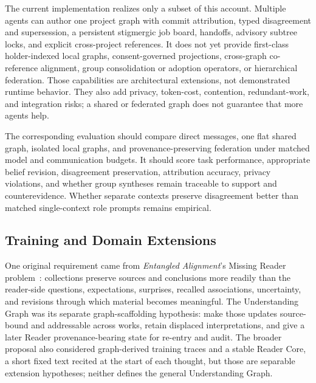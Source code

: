 The current implementation realizes only a subset of this account. Multiple agents can author one project graph with commit attribution, typed disagreement and supersession, a persistent stigmergic job board, handoffs, advisory subtree locks, and explicit cross-project references. It does not yet provide first-class holder-indexed local graphs, consent-governed projections, cross-graph co-reference alignment, group consolidation or adoption operators, or hierarchical federation. Those capabilities are architectural extensions, not demonstrated runtime behavior. They also add privacy, token-cost, contention, redundant-work, and integration risks; a shared or federated graph does not guarantee that more agents help.

The corresponding evaluation should compare direct messages, one flat shared graph, isolated local graphs, and provenance-preserving federation under matched model and communication budgets. It should score task performance, appropriate belief revision, disagreement preservation, attribution accuracy, privacy violations, and whether group syntheses remain traceable to support and counterevidence. Whether separate contexts preserve disagreement better than matched single-context role prompts remains empirical.

\subsection{Training and Domain Extensions}

One original requirement came from \emph{Entangled Alignment}'s Missing Reader problem~\cite{westerberg2026entangled}: collections preserve sources and conclusions more readily than the reader-side questions, expectations, surprises, recalled associations, uncertainty, and revisions through which material becomes meaningful. The Understanding Graph was its separate graph-scaffolding hypothesis: make those updates source-bound and addressable across works, retain displaced interpretations, and give a later Reader provenance-bearing state for re-entry and audit. The broader proposal also considered graph-derived training traces and a stable Reader Core, a short fixed text recited at the start of each thought, but those are separable extension hypotheses; neither defines the general Understanding Graph.

